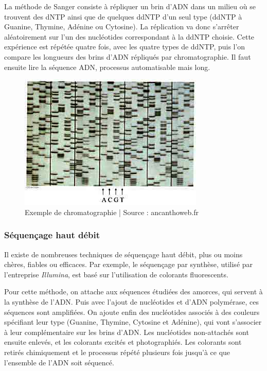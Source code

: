 La méthode de Sanger consiste à répliquer un brin d'ADN dans un milieu où se trouvent des dNTP ainsi que de quelques ddNTP d'un seul type (ddNTP à Guanine, Thymine, Adénine ou Cytosine). La réplication va donc s’arrêter aléatoirement sur l'un des nucléotides correspondant à la ddNTP choisie. Cette expérience est répétée quatre fois, avec les quatre types de ddNTP, puis l'on compare les longueurs des brins d'ADN répliqués par chromatographie. Il faut ensuite lire la séquence ADN, processus automatisable mais long.


\begin{figure}[!ht]
    \center
    \includegraphics[]{./images/chromato_acanthoweb.jpg}
    \caption{Exemple de chromatographie | Source : ancanthoweb.fr}
    \label{chromato}
\end{figure}


\subsubsection{Séquençage haut débit}
Il existe de nombreuses techniques de séquençage haut débit, plus ou moins chères, fiables ou efficaces.
Par exemple, le séquençage par synthèse, utilisé par l'entreprise \emph{Illumina}, est basé sur l'utilisation de colorants fluorescents.

Pour cette méthode, on attache aux séquences étudiées des amorces, qui servent à la synthèse de l'ADN. Puis avec l'ajout de nucléotides et d'ADN polymérase, ces séquences sont amplifiées. On ajoute enfin des nucléotides associés à des couleurs spécifiant leur type (Guanine, Thymine, Cytosine et Adénine), qui vont s'associer à leur complémentaire sur les brins d'ADN. Les nucléotides non-attachés sont ensuite enlevés, et les colorants excités et photographiés. Les colorants sont retirés chimiquement et le processus répété plusieurs fois jusqu'à ce que l'ensemble de l'ADN soit séquencé.

